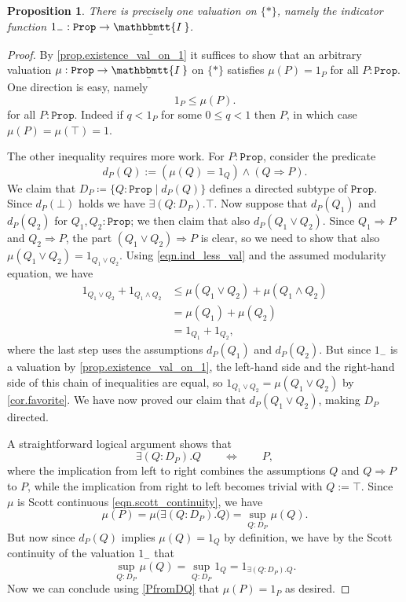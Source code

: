 \documentclass[11pt, oneside, article]{memoir}
\theoremstyle{plain}
\newtheorem{proposition}[theorem]{Proposition}
\theoremstyle{definition}
\theoremstyle{remark}
\newcommand{\const}[1]{\mathtt{#1}}
\newcommand{\ubar}[1]{\underaccent{\bar}{#1}}
\newcommand{\ind}[1]{1_{#1}}
\newcommand{\inc}{\ind{-}}				%
\newcommand{\internal}[1]{\raisebox{-.03ex}{$\mathbbmtt{#1}$}}
\newcommand{\hs}{\hspace{1.1pt}}
\newcommand{\tii}{\ubar{\internal{I\hs\hs}}\!\hs}
\newcommand{\prop}{\const{Prop}}
\begin{document}
\begin{proposition}\label{prop.uniqueness_val_on_1}
	There is precisely one valuation on $\{*\}$, namely the indicator function $\inc : \prop \to \tii$.
\end{proposition}
\begin{proof}
By \cref{prop.existence_val_on_1} it suffices to show that an arbitrary valuation $\mu : \prop \to \tii$ on $\{*\}$ satisfies $\mu(P) = \ind{P}$ for all $P : \prop$. One direction is easy, namely
	\begin{equation}\label{eqn.ind_less_val}
		\ind{P} \le \mu(P).
	\end{equation}
	for all $P:\prop$. Indeed if $q<\ind{P}$ for some $0\leq q<1$ then $P$, in which case $\mu(P)=\mu(\top)=1$. 
	
	The other inequality requires more work. For $P:\prop$, consider the predicate
	\[
		d_P(Q) := \left( \mu(Q) = \ind{Q} \right) \land (Q \Rightarrow P).
	\]
	We claim that $D_P\coloneqq\{Q:\prop\mid d_P(Q)\}$ defines a directed subtype of $\prop$. Since $d_P(\bot)$ holds we have $\exists(Q:D_P).\top$. Now suppose that $d_P(Q_1)$ and $d_P(Q_2)$ for $Q_1, Q_2 : \prop$; we then claim that also $d_P(Q_1 \lor Q_2)$. Since $Q_1 \Rightarrow P$ and $Q_2 \Rightarrow P$, the part $(Q_1 \lor Q_2) \Rightarrow P$ is clear, so we need to show that also $\mu(Q_1 \lor Q_2) = \ind{Q_1 \lor Q_2}$. Using \eqref{eqn.ind_less_val} and the assumed modularity equation, we have
	\begin{align*}
		\ind{Q_1 \lor Q_2} + \ind{Q_1 \land Q_2}	& \le \mu(Q_1 \lor Q_2) + \mu(Q_1 \land Q_2)	\\
								& = \mu(Q_1) + \mu(Q_2) \\
								& = \ind{Q_1} + \ind{Q_2},
	\end{align*}
	where the last step uses the assumptions $d_P(Q_1)$ and $d_P(Q_2)$. But since $\inc$ is a valuation by \cref{prop.existence_val_on_1}, the left-hand side and the right-hand side of this chain of inequalities are equal, so $\ind{Q_1 \lor Q_2} = \mu(Q_1 \lor Q_2)$ by \cref{cor.favorite}. We have now proved our claim that $d_P(Q_1 \lor Q_2)$, making $D_P$ directed.

	A straightforward logical argument shows that
	\begin{equation}
		\label{PfromDQ}
		\exists (Q : D_P). Q \qquad \Longleftrightarrow \qquad P,
	\end{equation}
	where the implication from left to right combines the assumptions $Q$ and $Q \Rightarrow P$ to $P$, while the implication from right to left becomes trivial with $Q := \top$. Since $\mu$ is Scott continuous \eqref{eqn.scott_continuity}, we have
	\[
		\mu(P) = \mu\big( \exists (Q : D_P) . Q \big) = \sup_{Q : D_P} \mu(Q).
	\]
	But now since $d_P(Q)$ implies $\mu(Q) = \ind{Q}$ by definition, we have by the Scott continuity of the valuation $\inc$ that
	\[
		\sup_{Q : D_P} \mu(Q) = \sup_{Q : D_P} \ind{Q} = \ind{\exists(Q:D_P).Q}.
	\]
Now we can conclude using \eqref{PfromDQ} that $\mu(P)=\ind{P}$ as desired.
\end{proof}
\end{document}
